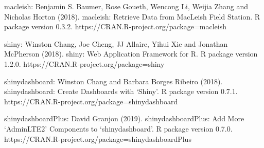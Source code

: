 \documentclass[10pt,letterpaper]{article}
\begin{document}
macleish: Benjamin S. Baumer, Rose Goueth, Wencong Li, Weijia Zhang and
Nicholas Horton (2018). macleish: Retrieve Data from MacLeish Field
Station. R package version 0.3.2.
https://CRAN.R-project.org/package=macleish

shiny: Winston Chang, Joe Cheng, JJ Allaire, Yihui Xie and Jonathan
McPherson (2018). shiny: Web Application Framework for R. R package
version 1.2.0. https://CRAN.R-project.org/package=shiny

shinydashboard: Winston Chang and Barbara Borges Ribeiro (2018).
shinydashboard: Create Dashboards with `Shiny'. R package version 0.7.1.
https://CRAN.R-project.org/package=shinydashboard

shinydashboardPlus: David Granjon (2019). shinydashboardPlus: Add More
`AdminLTE2' Components to `shinydashboard'. R package version 0.7.0.
https://CRAN.R-project.org/package=shinydashboardPlus

\nolinenumbers
\end{document}
